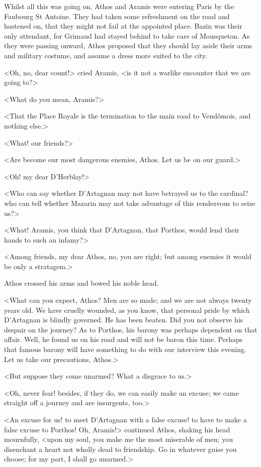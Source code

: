 Whilst all this was going on, Athos and Aramis were entering Paris by the Faubourg St Antoine. They had taken some refreshment on the road and hastened on, that they might not fail at the appointed place. Bazin was their only attendant, for Grimaud had stayed behind to take care of Mousqueton. As they were passing onward, Athos proposed that they should lay aside their arms and military costume, and assume a dress more suited to the city.

<Oh, no, dear count!> cried Aramis, <is it not a warlike encounter that we are going to?>

<What do you mean, Aramis?>

<That the Place Royale is the termination to the main road to Vendômois, and nothing else.>

<What! our friends?>

<Are become our most dangerous enemies, Athos. Let us be on our guard.>

<Oh! my dear D'Herblay!>

<Who can say whether D'Artagnan may not have betrayed us to the cardinal? who can tell whether Mazarin may not take advantage of this rendezvous to seize us?>

<What! Aramis, you think that D'Artagnan, that Porthos, would lend their hands to such an infamy?>

<Among friends, my dear Athos, no, you are right; but among enemies it would be only a stratagem.>

Athos crossed his arms and bowed his noble head.

<What can you expect, Athos? Men are so made; and we are not always twenty years old. We have cruelly wounded, as you know, that personal pride by which D'Artagnan is blindly governed. He has been beaten. Did you not observe his despair on the journey? As to Porthos, his barony was perhaps dependent on that affair. Well, he found us on his road and will not be baron this time. Perhaps that famous barony will have something to do with our interview this evening. Let us take our precautions, Athos.>

<But suppose they come unarmed? What a disgrace to us.>

<Oh, never fear! besides, if they do, we can easily make an excuse; we came straight off a journey and are insurgents, too.>

<An excuse for us! to meet D'Artagnan with a false excuse! to have to make a false excuse to Porthos! Oh, Aramis!> continued Athos, shaking his head mournfully, <upon my soul, you make me the most miserable of men; you disenchant a heart not wholly dead to friendship. Go in whatever guise you choose; for my part, I shall go unarmed.>

